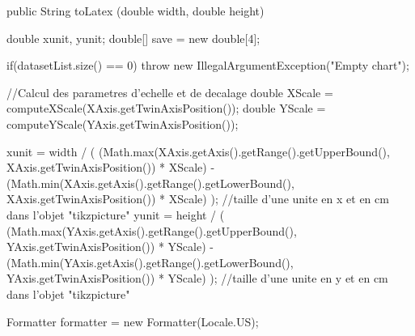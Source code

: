 \begin{code}

   public String toLatex (double width, double height) \begin{hide} {
      double xunit, yunit;
      double[] save = new double[4];

      if(datasetList.size() == 0)
         throw new IllegalArgumentException("Empty chart");

      //Calcul des parametres d'echelle et de decalage
      double XScale = computeXScale(XAxis.getTwinAxisPosition());
      double YScale = computeYScale(YAxis.getTwinAxisPosition());

      xunit = width / ( (Math.max(XAxis.getAxis().getRange().getUpperBound(), XAxis.getTwinAxisPosition()) * XScale) - (Math.min(XAxis.getAxis().getRange().getLowerBound(), XAxis.getTwinAxisPosition()) * XScale) );
      //taille d'une unite en x et en cm dans l'objet "tikzpicture"
      yunit = height / ( (Math.max(YAxis.getAxis().getRange().getUpperBound(), YAxis.getTwinAxisPosition()) * YScale) - (Math.min(YAxis.getAxis().getRange().getLowerBound(), YAxis.getTwinAxisPosition()) * YScale) );
      //taille d'une unite en y et en cm dans l'objet "tikzpicture"

      Formatter formatter = new Formatter(Locale.US);

}
\end{hide}
\end{code}
